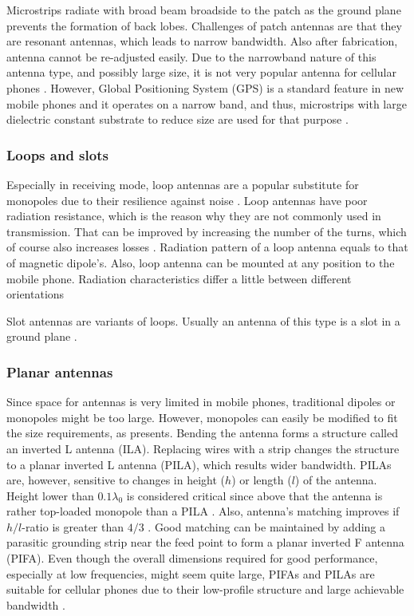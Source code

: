 Microstrips radiate with broad beam broadside to the patch as the ground plane prevents the formation of back lobes. Challenges of patch antennas are that they are resonant antennas, which leads to narrow bandwidth. Also after fabrication, antenna cannot be re-adjusted easily. Due to the narrowband nature of this antenna type, and possibly large size, it is not very popular antenna for cellular phones \cite{stutzman}. However, Global Positioning System (GPS) is a standard feature in new mobile phones and it operates on a narrow band, and thus, microstrips with large dielectric constant substrate to reduce size are used for that purpose \cite{stutzman}.

\subsubsection{Loops and slots}
\label{sec:loop}
Especially in receiving mode, loop antennas are a popular substitute for monopoles due to their resilience against noise \cite{balanis}. Loop antennas have poor radiation resistance, which is the reason why they are not commonly used in transmission. That can be improved by increasing the number of the turns, which of course also increases losses \cite{stutzman}. Radiation pattern of a loop antenna equals to that of magnetic dipole's.  Also, loop antenna can be mounted at any position to the mobile phone. Radiation characteristics differ a little between different orientations

Slot antennas are variants of loops. Usually an antenna of this type is a slot in a ground plane \cite{stutzman}. 

\subsubsection{Planar antennas}
\label{sec:planar}

Since space for antennas is very limited in mobile phones, traditional dipoles or monopoles might be too large. However, monopoles can easily be modified to fit the size requirements, as \cite{planar_antennas, balanis} presents. Bending the antenna forms a structure called an inverted L antenna (ILA). Replacing wires with a strip changes the structure to a planar inverted L antenna (PILA), which results wider bandwidth. PILAs are, however, sensitive to changes in height ($h$) or length ($l$) of the antenna. Height lower than $0.1\lambda_0$ is considered critical since above that the antenna is rather top-loaded monopole than a PILA \cite{planar_antennas}. Also, antenna's matching improves if $h/l$-ratio is greater than $4/3$ \cite{planar_antennas}. Good matching can be maintained by adding a parasitic grounding strip near the feed point to form a planar inverted F antenna (PIFA). Even though the overall dimensions required for good performance, especially at low frequencies, might seem quite large, PIFAs and PILAs are suitable for cellular phones due to their low-profile structure and large achievable bandwidth \cite{balanis}.  

